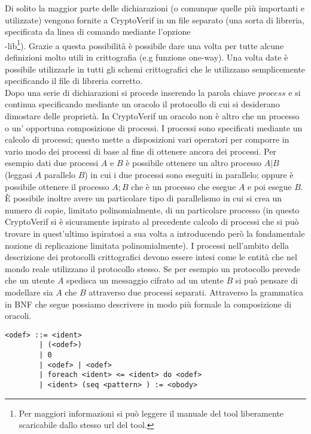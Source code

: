 \documentclass[a4paper,openright,twoside,12pt]{report}
\begin{document}
\newpage
Di solito la maggior parte delle dichiarazioni (o comunque quelle pi\`u importanti e utilizzate) vengono fornite a CryptoVerif in un file separato (una sorta di libreria, specificata da linea di comando
mediante l'opzione \\-lib\footnote{Per maggiori informazioni si pu\`o leggere il manuale del tool liberamente scaricabile dallo stesso url del tool.}). 
Grazie a questa possibilit\`a \`e possibile dare una volta per tutte alcune definizioni molto utili in crittografia (e.g funzione one-way). 
Una volta date \`e possibile utilizzarle in tutti gli schemi crittografici che le utilizzano semplicemente specificando il file di libreria corretto.\\
Dopo una serie di dichiarazioni si procede inserendo la parola chiave $process$ e si continua specificando mediante un oracolo il protocollo di cui si desiderano dimostare delle propriet\`a. 
In CryptoVerif un oracolo non \`e altro che un processo o un' opportuna composizione di processi. 
I processi sono specificati mediante un calcolo di processi; questo mette a disposizioni vari operatori per comporre in vario modo dei processi di base al fine di ottenere
ancora dei processi. Per esempio dati due processi $A$ e $B$ \`e possibile ottenere un altro processo $A|B$ (leggasi $A$ parallelo $B$) in cui i due processi
sono eseguiti in parallelo; oppure \`e possibile ottenere il processo $A;B$ che \`e un processo che esegue $A$ e poi esegue $B$. \`E possibile inoltre avere
un particolare tipo di parallelismo in cui si crea un numero di copie, limitato polinomialmente, di un particolare processo (in questo CryptoVerif
si \`e sicuramente ispirato al precedente calcolo di processi che si pu\`o trovare in \cite{MitchellRST06} quest'ultimo ispiratosi a sua volta
a \cite{AbadiG99} introducendo per\`o la fondamentale nozione di replicazione limitata polinomialmente). I processi nell'ambito della descrizione dei protocolli crittografici
devono essere intesi come le entit\`a che nel mondo reale utilizzano il protocollo stesso. Se per esempio un protocollo prevede che un utente $A$ spedisca un messaggio cifrato ad un 
utente $B$ si pu\`o pensare di modellare sia $A$ che $B$ attraverso due processi separati. Attraverso la grammatica in BNF che segue possiamo descrivere in modo pi\`u formale 
la composizione di oracoli.\\
 
\begin{verbatim}
<odef> ::= <ident>
        | (<odef>)
        | 0
        | <odef> | <odef>
        | foreach <ident> <= <ident> do <odef>
        | <ident> (seq <pattern> ) := <obody>
\end{verbatim} 
 
\end{document}
